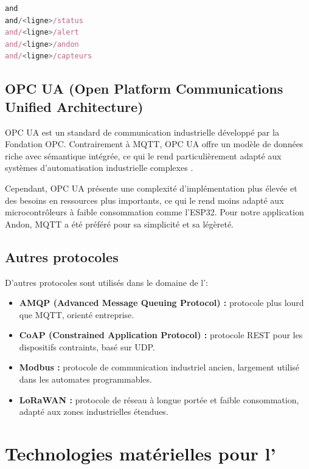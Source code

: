 \begin{lstlisting}[language=JavaScript,caption={Structure des topics MQTT},label={lst:mqtt_topics}]
and
and/<ligne>/status
and/<ligne>/alert
and/<ligne>/andon
and/<ligne>/capteurs
\end{lstlisting}

\subsection{OPC UA (Open Platform Communications Unified Architecture)}

OPC UA est un standard de communication industrielle développé par la Fondation OPC. Contrairement à MQTT, OPC UA offre un modèle de données riche avec sémantique intégrée, ce qui le rend particulièrement adapté aux systèmes d'automatisation industrielle complexes \cite{leitner2016industrial}.

Cependant, OPC UA présente une complexité d'implémentation plus élevée et des besoins en ressources plus importants, ce qui le rend moins adapté aux microcontrôleurs à faible consommation comme l'ESP32. Pour notre application Andon, MQTT a été préféré pour sa simplicité et sa légèreté.

\subsection{Autres protocoles}

D'autres protocoles sont utilisés dans le domaine de l'\iiot :

\begin{itemize}
    \item \textbf{AMQP (Advanced Message Queuing Protocol) :} protocole plus lourd que MQTT, orienté entreprise.
    \item \textbf{CoAP (Constrained Application Protocol) :} protocole REST pour les dispositifs contraints, basé sur UDP.
    \item \textbf{Modbus :} protocole de communication industriel ancien, largement utilis\'e dans les automates programmables.
    \item \textbf{LoRaWAN :} protocole de r\'eseau \`a longue port\'ee et faible consommation, adapt\'e aux zones industrielles \'etendues.
\end{itemize}

\section{Technologies mat\'erielles pour l'\iiot}


